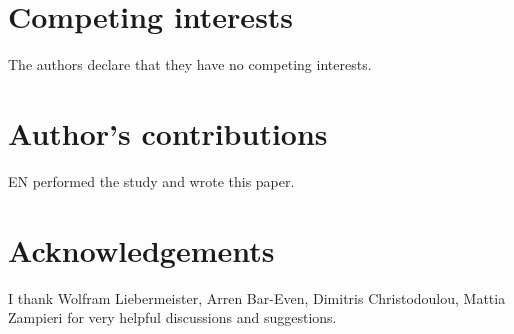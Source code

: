 \documentclass[twocolumn]{bmcart}%
\begin{document}
\begin{backmatter}

\section*{Competing interests}
  The authors declare that they have no competing interests.

\section*{Author's contributions}
EN performed the study and wrote this paper.

\section*{Acknowledgements}
I thank Wolfram Liebermeister, Arren Bar-Even, Dimitris Christodoulou, Mattia Zampieri for very helpful discussions and suggestions.





\end{backmatter}
\end{document}
